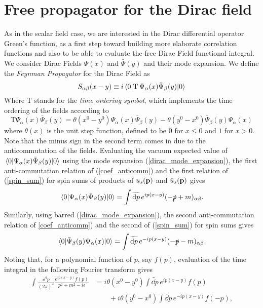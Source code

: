 \section{Free propagator for the Dirac field}
As in the scalar field case, we are interested in the Dirac differential operator Green's function, as a first step toward building more elaborate correlation functions and also to be able to evaluate the free Dirac Field functional integral. We consider Dirac Fields $\Psi(x)$ and $\bar{\Psi}(y)$ and their mode expansion. We define the \textit{Feynman Propagator} for the Dirac Field as
\begin{equation}
    S_{\alpha\beta}(x-y)\equiv i\vev{\text{T}\,\Psi_\alpha(x)\bar{\Psi}_\beta(y)}
\end{equation}
Where $\text{T}$ stands for the \textit{time ordering symbol}, which implements the time ordering of the fields according to
\begin{equation}
    \text{T}\Psi_\alpha(x)\bar{\Psi}_\beta(y)=\theta(x^0-y^0)\Psi_\alpha(x)\bar{\Psi}_\beta(y)-\theta(y^0-x^0)\bar{\Psi}_\beta(y)\Psi_\alpha(x)
\end{equation}
where $\theta(x)$ is the unit step function, defined to be $0$ for $x\leq0$ and $1$ for $x>0$. Note that the minus sign in the second term comes in due to the anticommutation of the fields. Evaluating the vacuum expected value of $\vev{\Psi_\alpha(x)\bar{\Psi}_\beta(y)}$ using the mode expansion (\ref{dirac_mode_expansion}), the first anti-commutation relation of (\ref{coef_anticomm}) and the first relation of (\ref{spin_sum}) for spin sums of products of $u_s(\vb{p)}$ and $\bar{u}_s(\vb{p})$ gives
\begin{equation}
    \vev{\Psi_\alpha(x)\bar{\Psi}_\beta(y)}=\int\widetilde{\dd p}\,e^{ip(x-y)}(-\slashed{p}+m)_{\alpha\beta}.
\end{equation}
Similarly, using barred (\ref{dirac_mode_expansion}), the second anti-commutation relation of \ref{coef_anticomm}) and the second of (\ref{spin_sum}) for spin sums gives 
\begin{equation}
    \vev{\bar{\Psi}_\beta(y)\Psi_\alpha(x)}=\int\widetilde{\dd p}\,e^{-ip(x-y)}(-\slashed{p}-m)_{\alpha\beta}.
\end{equation}
Noting that, for a polynomial function of $p$, say $f(p)$, evaluation of the time integral in the following Fourier transform gives
\begin{equation}
\begin{aligned}
\int\frac{\dd^4p}{(2\pi)^4}\frac{e^{ip(x-y)}f(p)}{p^2+m^2-i\epsilon}&=i\theta(x^0-y^0)\int\widetilde{\dd p}\,e^{ip(x-y)}f(p)\\&\qquad+ i \theta(y^0-x^0)\int\widetilde{\dd p}\,e^{-ip(x-y)}f(-p),
\end{aligned}
\end{equation}
